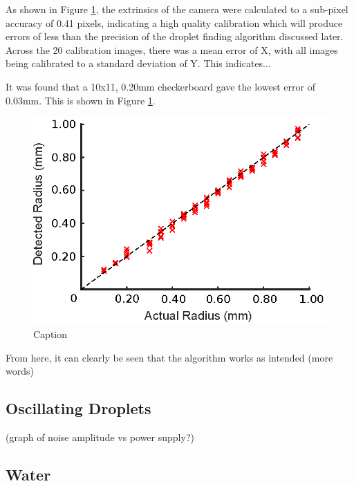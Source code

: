 \documentclass{physics_article_B}
\begin{document}
		As shown in Figure \ref{fig:calib:error}, the extrinsics of the camera were calculated to a sub-pixel accuracy of 0.41 pixels, indicating a high quality calibration which will produce errors of less than the precision of the droplet finding algorithm discussed later. Across the 20 calibration images, there was a mean error of X, with all images being calibrated to a standard deviation of Y. This indicates...
	        
	    It was found that a 10x11, 0.20mm checkerboard gave the lowest error of 0.03mm. This is shown in Figure \ref{fig:calib:error}. %
        
            \begin{figure}[H]
                \centering
                \hspace*{-1cm}\includegraphics{Figures/CameraCalib.eps}
                \caption{Caption}
                \label{fig:calib:error}
            \end{figure}
        
     	From here, it can clearly be seen that the algorithm works as intended (more words)

    \subsection{Oscillating Droplets}
      
    (graph of noise amplitude vs power supply?)
 
 	\subsection{Water}
 
\end{document}
